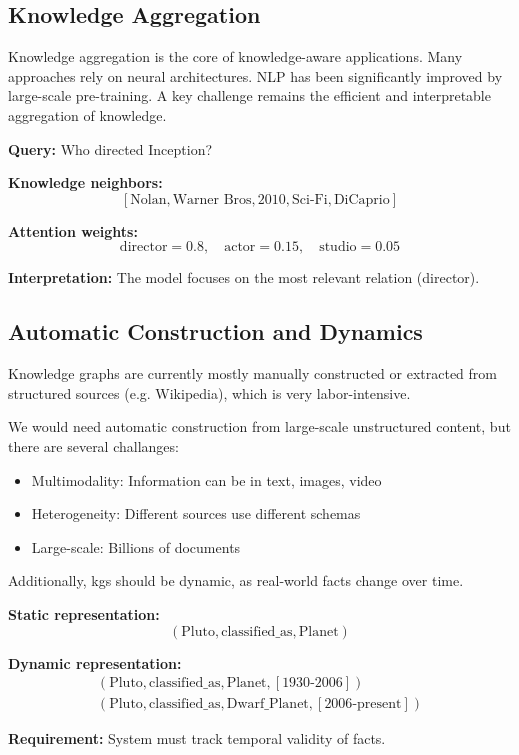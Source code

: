 \subsection*{Knowledge Aggregation}
Knowledge aggregation is the core of knowledge-aware applications. Many approaches rely on neural architectures. NLP
has been significantly improved by large-scale pre-training. A key challenge remains the efficient and interpretable
aggregation of knowledge.
\begin{bsp}
    \textbf{Query:}
    Who directed Inception?

    \textbf{Knowledge neighbors:}
    \[
        [\text{Nolan}, \text{Warner Bros}, 2010, \text{Sci-Fi}, \text{DiCaprio}]
    \]

    \textbf{Attention weights:}
    \[
        \text{director} = 0.8, \quad \text{actor} = 0.15, \quad \text{studio} = 0.05
    \]

    \textbf{Interpretation:}
    The model focuses on the most relevant relation (director).
\end{bsp}

\subsection*{Automatic Construction and Dynamics}
Knowledge graphs are currently mostly manually constructed or extracted from structured sources (e.g. Wikipedia),
which is very labor-intensive.

We would need automatic construction from large-scale unstructured content, but there are several challanges:
\begin{itemize}
    \item Multimodality: Information can be in text, images, video

    \item Heterogeneity: Different sources use different schemas

    \item Large-scale: Billions of documents

\end{itemize}
Additionally, \glspl{kg} should be dynamic, as real-world facts change over time.
\begin{bsp}
    \textbf{Static representation:}
    \[
        (\text{Pluto}, \text{classified\_as}, \text{Planet})
    \]

    \textbf{Dynamic representation:}
    \begin{align*}
    (\text{Pluto}, \text{classified\_as}, \text{Planet}, [1930\text{-}2006])
        \\
        (\text{Pluto}, \text{classified\_as}, \text{Dwarf\_Planet}, [2006\text{-present}])
    \end{align*}

    \textbf{Requirement:}
    System must track temporal validity of facts.
\end{bsp}

